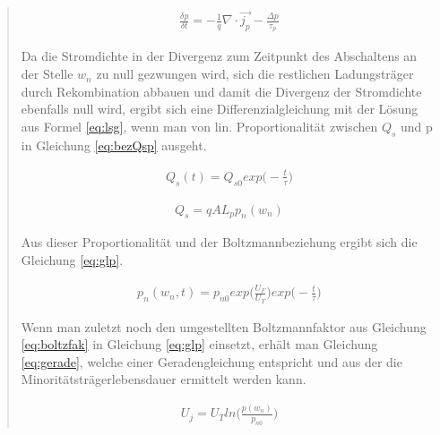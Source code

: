 \begin{quote}
    \begin{equation}
         \begin{split}
             \frac{\delta p}{\delta t}=-\frac{1}{q}\nabla \cdot \vec{j_{p}}-\frac{\Delta p}{\tau_{p}}
         \end{split}
         \label{eq:bilanz}
    \end{equation}

    Da die Stromdichte in der Divergenz zum Zeitpunkt des Abschaltens an der
    Stelle $w_{n}$ zu null gezwungen wird, sich die restlichen Ladungsträger
    durch Rekombination abbauen und damit die Divergenz der Stromdichte
    ebenfalls null wird, ergibt sich eine Differenzialgleichung mit der Lösung
    aus Formel \ref{eq:lsg}, wenn man von lin. Proportionalität zwischen $Q_{s}$
    und p in Gleichung \ref{eq:bezQsp} ausgeht.

    \begin{equation}
         \begin{split}
             Q_{s}(t)=Q_{s0}exp\Big(-\frac{t}{\tau}\Big)
         \end{split}
         \label{eq:lsg}
    \end{equation}

    \begin{equation}
         \begin{split}
             Q_{s}=qAL_{p}p_{n}(w_{n})
         \end{split}
         \label{eq:bezQsp}
    \end{equation}

    Aus dieser Proportionalität und der Boltzmannbeziehung ergibt sich die
    Gleichung \ref{eq:glp}.

    \begin{equation}
         \begin{split}
             p_{n}(w_{n},t)=p_{n0}exp\Big(\frac{U_{F}}{U_{T}}\Big)exp\Big(-\frac{t}{\tau}\Big)
         \end{split}
         \label{eq:glp}
    \end{equation}

    Wenn man zuletzt noch den umgestellten Boltzmannfaktor aus Gleichung
    \ref{eq:boltzfak} in Gleichung \ref{eq:glp} einsetzt, erhält man Gleichung
    \ref{eq:gerade}, welche einer Geradengleichung entspricht und aus der die
    Minoritätsträgerlebensdauer ermittelt werden kann.

    \begin{equation}
         \begin{split}
             U_{j}=U_{T}ln\Big(\frac{p(w_{n})}{p_{n0}}\Big)
         \end{split}
         \label{eq:boltzfak}
    \end{equation}


\end{quote}
